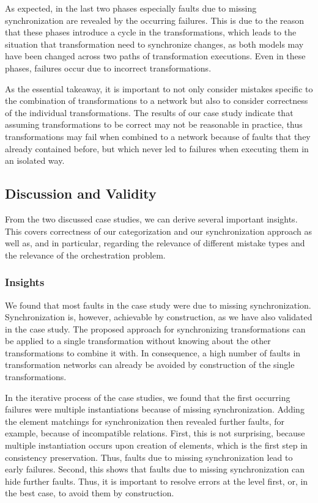 As expected, in the last two phases especially faults due to missing synchronization are revealed by the occurring failures.
This is due to the reason that these phases introduce a cycle in the transformations, which leads to the situation that transformation need to synchronize changes, as both models may have been changed across two paths of transformation executions.
Even in these phases, failures occur due to incorrect transformations.

As the essential takeaway, it is important to not only consider mistakes specific to the combination of transformations to a network but also to consider correctness of the individual transformations.
The results of our case study indicate that assuming transformations to be correct may not be reasonable in practice, thus transformations may fail when combined to a network because of faults that they already contained before, but which never led to failures when executing them in an isolated way.


\subsection{Discussion and Validity}

From the two discussed case studies, we can derive several important insights.
This covers correctness of our categorization and our synchronization approach as well as, and in particular, regarding the relevance of different mistake types and the relevance of the orchestration problem.

\subsubsection{Insights}

We found that most faults in the case study were due to missing synchronization.
Synchronization is, however, achievable by construction, as we have also validated in the case study.
The proposed approach for synchronizing transformations can be applied to a single transformation without knowing about the other transformations to combine it with.
In consequence, a high number of faults in transformation networks can already be avoided by construction of the single transformations.

In the iterative process of the case studies, we found that the first occurring failures were multiple instantiations because of missing synchronization.
Adding the element matchings for synchronization then revealed further faults, for example, because of incompatible relations.
First, this is not surprising, because multiple instantiation occurs upon creation of elements, which is the first step in consistency preservation.
Thus, faults due to missing synchronization lead to early failures.
Second, this shows that faults due to missing synchronization can hide further faults.
Thus, it is important to resolve errors at the \leveltransformation level first, or, in the best case, to avoid them by construction.

